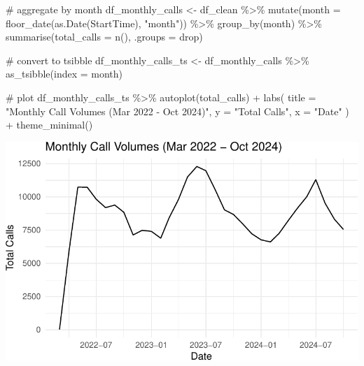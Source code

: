 \documentclass[
  letterpaper,
  DIV=11,
  numbers=noendperiod]{scrartcl}
\newenvironment{Shaded}{\begin{snugshade}}{\end{snugshade}}
\newcommand{\AttributeTok}[1]{\textcolor[rgb]{0.40,0.45,0.13}{#1}}
\newcommand{\CommentTok}[1]{\textcolor[rgb]{0.37,0.37,0.37}{#1}}
\newcommand{\FunctionTok}[1]{\textcolor[rgb]{0.28,0.35,0.67}{#1}}
\newcommand{\NormalTok}[1]{\textcolor[rgb]{0.00,0.23,0.31}{#1}}
\newcommand{\OtherTok}[1]{\textcolor[rgb]{0.00,0.23,0.31}{#1}}
\newcommand{\SpecialCharTok}[1]{\textcolor[rgb]{0.37,0.37,0.37}{#1}}
\newcommand{\StringTok}[1]{\textcolor[rgb]{0.13,0.47,0.30}{#1}}
\begin{document}
\begin{Shaded}
\begin{Highlighting}[]
\CommentTok{\# aggregate by month}
\NormalTok{df\_monthly\_calls }\OtherTok{\textless{}{-}}\NormalTok{ df\_clean }\SpecialCharTok{\%\textgreater{}\%}
  \FunctionTok{mutate}\NormalTok{(}\AttributeTok{month =} \FunctionTok{floor\_date}\NormalTok{(}\FunctionTok{as.Date}\NormalTok{(StartTime), }\StringTok{"month"}\NormalTok{)) }\SpecialCharTok{\%\textgreater{}\%}
  \FunctionTok{group\_by}\NormalTok{(month) }\SpecialCharTok{\%\textgreater{}\%}
  \FunctionTok{summarise}\NormalTok{(}\AttributeTok{total\_calls =} \FunctionTok{n}\NormalTok{(), }\AttributeTok{.groups =} \StringTok{\textquotesingle{}drop\textquotesingle{}}\NormalTok{)}

\CommentTok{\# convert to tsibble}
\NormalTok{df\_monthly\_calls\_ts }\OtherTok{\textless{}{-}}\NormalTok{ df\_monthly\_calls }\SpecialCharTok{\%\textgreater{}\%}
  \FunctionTok{as\_tsibble}\NormalTok{(}\AttributeTok{index =}\NormalTok{ month)}

\CommentTok{\# plot}
\NormalTok{df\_monthly\_calls\_ts }\SpecialCharTok{\%\textgreater{}\%}
  \FunctionTok{autoplot}\NormalTok{(total\_calls) }\SpecialCharTok{+}
  \FunctionTok{labs}\NormalTok{(}
    \AttributeTok{title =} \StringTok{"Monthly Call Volumes (Mar 2022 {-} Oct 2024)"}\NormalTok{, }
    \AttributeTok{y =} \StringTok{"Total Calls"}\NormalTok{, }
    \AttributeTok{x =} \StringTok{"Date"}
\NormalTok{  ) }\SpecialCharTok{+} 
  \FunctionTok{theme\_minimal}\NormalTok{() }
\end{Highlighting}
\end{Shaded}

\includegraphics{final_proj_group1_files/figure-pdf/unnamed-chunk-1-1.pdf}
\end{document}
